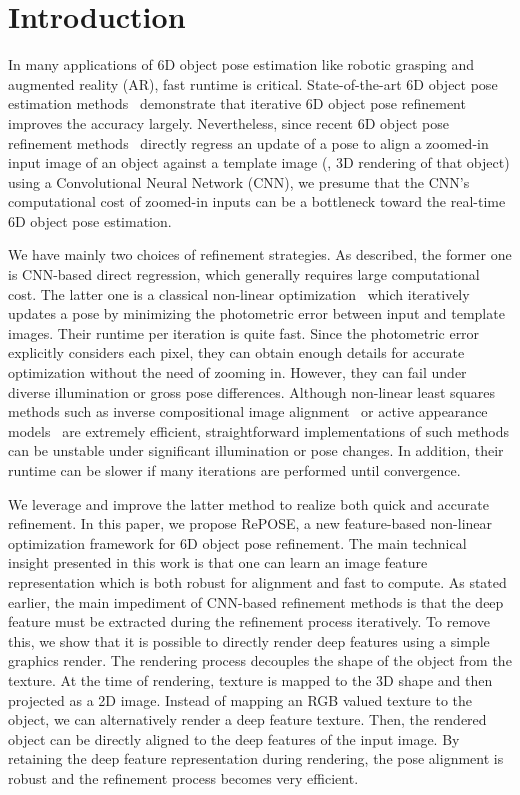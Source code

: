 \documentclass[10pt,twocolumn,letterpaper]{article}
\begin{document}
\section{Introduction}
\label{sec:introduction}


In many applications of 6D object pose estimation like robotic grasping and augmented reality (AR), fast runtime is critical.
State-of-the-art 6D object pose estimation methods~\cite{labbe2020,Zakharov_2019_ICCV,DBLP:journals/corr/RadL17} demonstrate that iterative 6D object pose refinement improves the accuracy largely. Nevertheless, since recent 6D object pose refinement methods~\cite{li2018deepim,labbe2020} directly regress an update of a pose to align a zoomed-in input image of an object against a template image (\eg, 3D rendering of that object) using a Convolutional Neural Network (CNN), we presume that the CNN's computational cost of zoomed-in inputs can be a bottleneck toward the real-time 6D object pose estimation. 

We have mainly two choices of refinement strategies. As described, the former one is CNN-based direct regression, which generally requires large computational cost. The latter one is a classical non-linear optimization~\cite{10.1007/BFb0067700} which iteratively updates a pose by minimizing the photometric error between input and template images. Their runtime per iteration is quite fast. Since the photometric error explicitly considers each pixel, they can obtain enough details for accurate optimization without the need of zooming in. However, they can fail under diverse illumination or gross pose differences. Although non-linear least squares methods such as inverse compositional image alignment~\cite{10.1023/B:VISI.0000011205.11775.fd,10.5555/1623264.1623280} or active appearance models~\cite{10.1007/BFb0054760,Matthews-2003-8630} are extremely efficient, straightforward implementations of such methods can be unstable under significant illumination or pose changes. In addition, their runtime can be slower if many iterations are performed until convergence.

We leverage and improve the latter method to realize both quick and accurate refinement. In this paper, we propose RePOSE, a new feature-based non-linear optimization framework for 6D object pose refinement. The main technical insight presented in this work is that one can learn an image feature representation which is both robust for alignment and fast to compute. As stated earlier, the main impediment of CNN-based refinement methods is that the deep feature must be extracted during the refinement process iteratively. To remove this, we show that it is possible to directly render deep features using a simple graphics render. The rendering process decouples the shape of the object from the texture. At the time of rendering, texture is mapped to the 3D shape and then projected as a 2D image. Instead of mapping an RGB valued texture to the object, we can alternatively render a deep feature texture. Then, the rendered object can be directly aligned to the deep features of the input image. By retaining the deep feature representation during rendering, the pose alignment is robust and the refinement process becomes very efficient.
\end{document}
